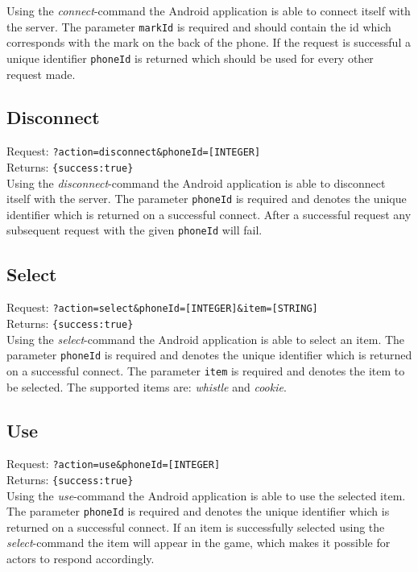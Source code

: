 \documentclass[a4paper,10pt]{article}
\begin{document}
\noindent Using the \emph{connect}-command the Android application is able to connect itself with the server.
The parameter \texttt{markId} is required and should contain the id which corresponds with the mark on the back of the phone.
If the request is successful a unique identifier \texttt{phoneId} is returned which should be used for every other request made.

\subsection{Disconnect}
Request: \texttt{?action=disconnect\&phoneId=[INTEGER]} \\
Returns: \texttt{\{success:true\}} \\

\noindent Using the \emph{disconnect}-command the Android application is able to disconnect itself with the server.
The parameter \texttt{phoneId} is required and denotes the unique identifier which is returned on a successful connect.
After a successful request any subsequent request with the given \texttt{phoneId} will fail.

\subsection{Select}
Request: \texttt{?action=select\&phoneId=[INTEGER]\&item=[STRING]} \\
Returns: \texttt{\{success:true\}} \\

\noindent Using the \emph{select}-command the Android application is able to select an item.
The parameter \texttt{phoneId} is required and denotes the unique identifier which is returned on a successful connect.
The parameter \texttt{item} is required and denotes the item to be selected. The supported items are: \emph{whistle} and \emph{cookie}.

\subsection{Use}
Request: \texttt{?action=use\&phoneId=[INTEGER]} \\
Returns: \texttt{\{success:true\}} \\

\noindent Using the \emph{use}-command the Android application is able to use the selected item.
The parameter \texttt{phoneId} is required and denotes the unique identifier which is returned on a successful connect.
If an item is successfully selected using the \emph{select}-command the item will appear in the game, which makes it possible for actors to respond accordingly.



\end{document}
